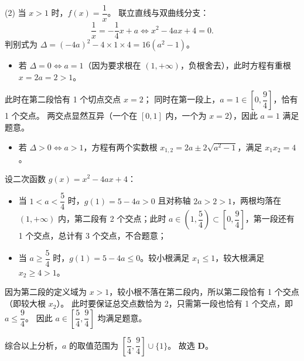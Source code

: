\begin{answer}
(2) 当 $x > 1$ 时，$f(x) = \dfrac{1}{x}$。
联立直线与双曲线分支：
\nopagebreak[4]
\[\frac{1}{x} = -\frac{1}{4}x + a \iff x^2 - 4ax + 4 = 0.\]
判别式为 $\Delta = (-4a)^2 - 4 \times 1 \times 4 = 16(a^2 - 1)$。
\begin{itemize}
\item 若 $\Delta = 0 \iff a = 1$（因为要求根在 $(1, +\infty)$，负根舍去），此时方程有重根 $x = 2a = 2 > 1$。
\end{itemize}
  此时在第二段恰有 1 个切点交点 $x = 2$；
  同时在第一段上，$a = 1 \in \left[0, \dfrac{9}{4}\right]$，恰有 1 个交点。
  两交点显然互异（一个在 $[0, 1]$ 内，一个为 $x = 2$），因此 $a = 1$ 满足题意。
\begin{itemize}
\item 若 $\Delta > 0 \iff a > 1$，方程有两个实数根 $x_{1,2} = 2a \pm 2\sqrt{a^2 - 1}$，满足 $x_1 x_2 = 4$。
\end{itemize}
  设二次函数 $g(x) = x^2 - 4ax + 4$：
\begin{itemize}
\item 当 $1 < a < \dfrac{5}{4}$ 时，$g(1) = 5 - 4a > 0$ 且对称轴 $2a > 2 > 1$，两根均落在 $(1, +\infty)$ 内，第二段有 2 个交点；此时 $a \in \left(1, \dfrac{5}{4}\right) \subset \left[0, \dfrac{9}{4}\right]$，第一段还有 1 个交点，总计有 3 个交点，不合题意；
\item 当 $a \geqslant \dfrac{5}{4}$ 时，$g(1) = 5 - 4a \leqslant 0$。较小根满足 $x_1 \leqslant 1$，较大根满足 $x_2 \geqslant 4 > 1$。
\end{itemize}
    因为第二段的定义域为 $x > 1$，较小根不落在第二段内，所以第二段恰有 1 个交点（即较大根 $x_2$）。
    此时要保证总交点数恰为 2，只需第一段也恰有 1 个交点，即 $a \leqslant \dfrac{9}{4}$。
    因此 $a \in \left[\dfrac{5}{4}, \dfrac{9}{4}\right]$ 均满足题意。

综合以上分析，$a$ 的取值范围为 $\left[\dfrac{5}{4}, \dfrac{9}{4}\right] \cup \{1\}$。
故选 \textbf{D}。


\par\medskip

\end{answer}

